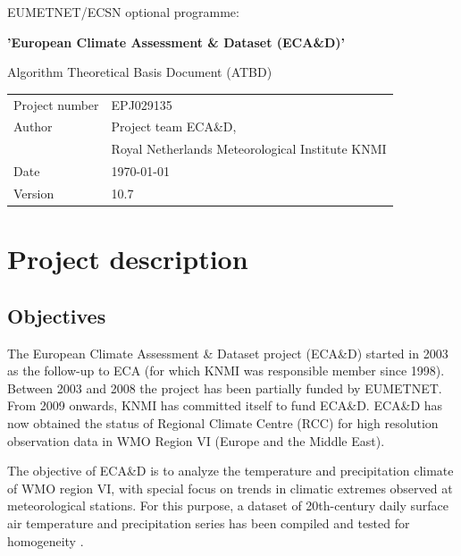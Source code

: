 \documentclass[a4paper,11pt]{article}
\begin{document}
\vspace{2cm}
\pagestyle{empty}

{\Large{EUMETNET/ECSN optional programme:}}
\vspace{1cm}

{\Large{\textbf{'European Climate Assessment \& Dataset (ECA\&D)'}}}
\vspace{1cm}

{\Large{Algorithm Theoretical Basis Document (ATBD)}}
\vspace{10cm}

\begin{tabular}{l@{: }l}
Project number & EPJ029135\\
Author & Project team ECA\&D,\\
& Royal Netherlands Meteorological Institute KNMI\\
Date & \today \\
Version & 10.7\\
\end{tabular}

\newpage
{}
\pagestyle{plain}

\tableofcontents

\newpage

\section{Project description}

\subsection{Objectives}
\label{sec:obj}

The European Climate Assessment \& Dataset project (ECA\&D) started in
2003 as the follow-up to ECA (for which KNMI was responsible member
since 1998). Between 2003 and 2008 the project has been partially
funded by EUMETNET. From 2009 onwards, KNMI has committed itself to
fund ECA\&D.
ECA\&D has now obtained the status of Regional Climate Centre (RCC)
for high resolution observation data in WMO Region VI (Europe and
the Middle East). 

The objective of ECA\&D is to analyze the temperature and
precipitation climate of WMO region VI, with special focus on trends
in climatic extremes observed at meteorological stations. For this
purpose, a dataset of 20th-century daily surface air temperature and
precipitation series has been compiled \citep{kleintank2002} and
tested for homogeneity \citep{wijngaard}.
\end{document}
